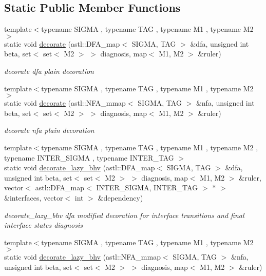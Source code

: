 \subsection*{Static Public Member Functions}
\begin{DoxyCompactItemize}
\item 
{\footnotesize template$<$typename S\+I\+G\+MA , typename T\+AG , typename M1 , typename M2 $>$ }\\static void \hyperlink{class_decoration_a61c1ab3fa28bceb41e488501811d5b19}{decorate} (astl\+::\+D\+F\+A\+\_\+map$<$ S\+I\+G\+MA, T\+AG $>$ \&dfa, unsigned int beta, set$<$ set$<$ M2 $>$ $>$ diagnosis, map$<$ M1, M2 $>$ \&ruler)
\begin{DoxyCompactList}\small\item\em decorate dfa plain decoration \end{DoxyCompactList}\item 
{\footnotesize template$<$typename S\+I\+G\+MA , typename T\+AG , typename M1 , typename M2 $>$ }\\static void \hyperlink{class_decoration_a62e20cbf4c6a0c225fc89bf07ec7ddd3}{decorate} (astl\+::\+N\+F\+A\+\_\+mmap$<$ S\+I\+G\+MA, T\+AG $>$ \&nfa, unsigned int beta, set$<$ set$<$ M2 $>$ $>$ diagnosis, map$<$ M1, M2 $>$ \&ruler)
\begin{DoxyCompactList}\small\item\em decorate nfa plain decoration \end{DoxyCompactList}\item 
{\footnotesize template$<$typename S\+I\+G\+MA , typename T\+AG , typename M1 , typename M2 , typename I\+N\+T\+E\+R\+\_\+\+S\+I\+G\+MA , typename I\+N\+T\+E\+R\+\_\+\+T\+AG $>$ }\\static void \hyperlink{class_decoration_a42f1826e20ed2f648caebb6723635e92}{decorate\+\_\+lazy\+\_\+bhv} (astl\+::\+D\+F\+A\+\_\+map$<$ S\+I\+G\+MA, T\+AG $>$ \&dfa, unsigned int beta, set$<$ set$<$ M2 $>$ $>$ diagnosis, map$<$ M1, M2 $>$ \&ruler, vector$<$ astl\+::\+D\+F\+A\+\_\+map$<$ I\+N\+T\+E\+R\+\_\+\+S\+I\+G\+MA, I\+N\+T\+E\+R\+\_\+\+T\+AG $>$ $\ast$ $>$ \&interfaces, vector$<$ int $>$ \&dependency)
\begin{DoxyCompactList}\small\item\em decorate\+\_\+lazy\+\_\+bhv dfa modified decoration for interface transitions and final interface states diagnosis \end{DoxyCompactList}\item 
{\footnotesize template$<$typename S\+I\+G\+MA , typename T\+AG , typename M1 , typename M2 $>$ }\\static void \hyperlink{class_decoration_a56c60f77b8e5b98edf44206844a8bc46}{decorate\+\_\+lazy\+\_\+bhv} (astl\+::\+N\+F\+A\+\_\+mmap$<$ S\+I\+G\+MA, T\+AG $>$ \&nfa, unsigned int beta, set$<$ set$<$ M2 $>$ $>$ diagnosis, map$<$ M1, M2 $>$ \&ruler)

\end{DoxyCompactItemize}
